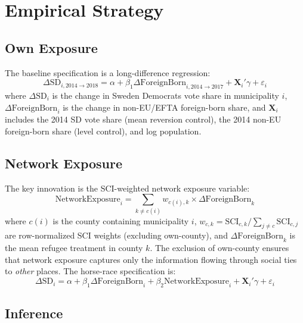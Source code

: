 \documentclass[12pt]{article}
\begin{document}



\section{Empirical Strategy}

\subsection{Own Exposure}

The baseline specification is a long-difference regression:
\begin{equation}
\Delta \text{SD}_{i,2014 \to 2018} = \alpha + \beta_1 \Delta \text{ForeignBorn}_{i,2014 \to 2017} + \mathbf{X}_i'\gamma + \varepsilon_i
\label{eq:own}
\end{equation}
where $\Delta \text{SD}_i$ is the change in Sweden Democrats vote share in municipality $i$, $\Delta \text{ForeignBorn}_i$ is the change in non-EU/EFTA foreign-born share, and $\mathbf{X}_i$ includes the 2014 SD vote share (mean reversion control), the 2014 non-EU foreign-born share (level control), and log population.

\subsection{Network Exposure}

The key innovation is the SCI-weighted network exposure variable:
\begin{equation}
\text{NetworkExposure}_i = \sum_{k \neq c(i)} w_{c(i),k} \times \Delta \text{ForeignBorn}_k
\label{eq:network}
\end{equation}
where $c(i)$ is the county containing municipality $i$, $w_{c,k} = \text{SCI}_{c,k} / \sum_{j \neq c} \text{SCI}_{c,j}$ are row-normalized SCI weights (excluding own-county), and $\Delta \text{ForeignBorn}_k$ is the mean refugee treatment in county $k$. The exclusion of own-county ensures that network exposure captures only the information flowing through social ties to \emph{other} places. The horse-race specification is:
\begin{equation}
\Delta \text{SD}_{i} = \alpha + \beta_1 \Delta \text{ForeignBorn}_i + \beta_2 \text{NetworkExposure}_i + \mathbf{X}_i'\gamma + \varepsilon_i
\label{eq:horse}
\end{equation}

\subsection{Inference}
\end{document}
